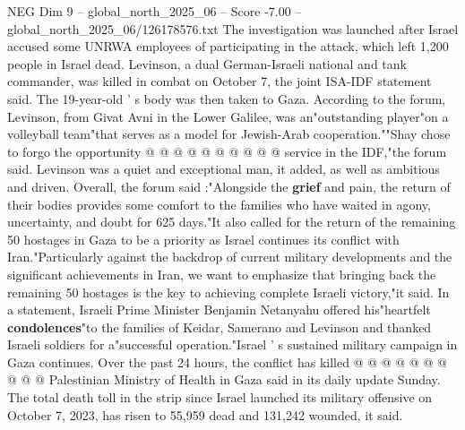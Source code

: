 \begin{textsample}{NEG Dim 9 – global\_north\_2025\_06 – Score -7.00 – global\_north\_2025\_06/126178576.txt}
The investigation was launched after Israel accused some UNRWA employees of participating in the attack, which left 1,200 people in Israel dead.
Levinson, a dual German-Israeli national and tank commander, was killed in combat on October 7, the joint ISA-IDF statement said.
The 19-year-old ' s body was then taken to Gaza.
According to the forum, Levinson, from Givat Avni in the Lower Galilee, was an"outstanding player"on a volleyball team"that serves as a model for Jewish-Arab cooperation.""Shay chose to forgo the opportunity @ @ @ @ @ @ @ @ @ @ service in the IDF,"the forum said.
Levinson was a quiet and exceptional man, it added, as well as ambitious and driven.
Overall, the forum said :"Alongside the \textbf{grief} and pain, the return of their bodies provides some comfort to the families who have waited in agony, uncertainty, and doubt for 625 days."It also called for the return of the remaining 50 hostages in Gaza to be a priority as Israel continues its conflict with Iran."Particularly against the backdrop of current military developments and the significant achievements in Iran, we want to emphasize that bringing back the remaining 50 hostages is the key to achieving complete Israeli victory,"it said.
In a statement, Israeli Prime Minister Benjamin Netanyahu offered his"heartfelt \textbf{condolences}"to the families of Keidar, Samerano and Levinson and thanked Israeli soldiers for a"successful operation."Israel ' s sustained military campaign in Gaza continues.
Over the past 24 hours, the conflict has killed @ @ @ @ @ @ @ @ @ @ Palestinian Ministry of Health in Gaza said in its daily update Sunday.
The total death toll in the strip since Israel launched its military offensive on October 7, 2023, has risen to 55,959 dead and 131,242 wounded, it said.

\end{textsample}
